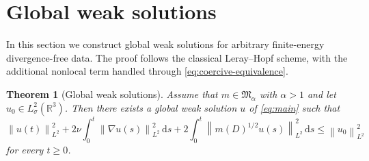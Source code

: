 \documentclass[11pt]{article}
\newtheorem{theorem}{Theorem}[section]
\theoremstyle{definition}
\theoremstyle{remark}
\newcommand{\R}{\mathbb{R}}
\newcommand{\dd}{\,\mathrm{d}}
\newcommand{\norm}[1]{\left\lVert #1\right\rVert}
\begin{document}
\section{Global weak solutions}\label{sec:weak}

In this section we construct global weak solutions for arbitrary finite-energy divergence-free data. The proof follows the classical Leray--Hopf scheme, with the additional nonlocal term handled through \cref{eq:coercive-equivalence}.

\begin{theorem}[Global weak solutions]\label{thm:weak}
Assume that $m\in\mathfrak M_\alpha$ with $\alpha>1$ and let $u_0\in L^2_\sigma(\R^3)$. Then there exists a global weak solution $u$ of \eqref{eq:main} such that
\begin{equation}\label{eq:weak-energy}
\norm{u(t)}_{L^2}^2
+
2\nu \int_0^t \norm{\nabla u(s)}_{L^2}^2 \dd s
+
2 \int_0^t \norm{m(D)^{1/2}u(s)}_{L^2}^2 \dd s
\le
\norm{u_0}_{L^2}^2
\end{equation}
for every $t\ge0$.
\end{theorem}
\end{document}
